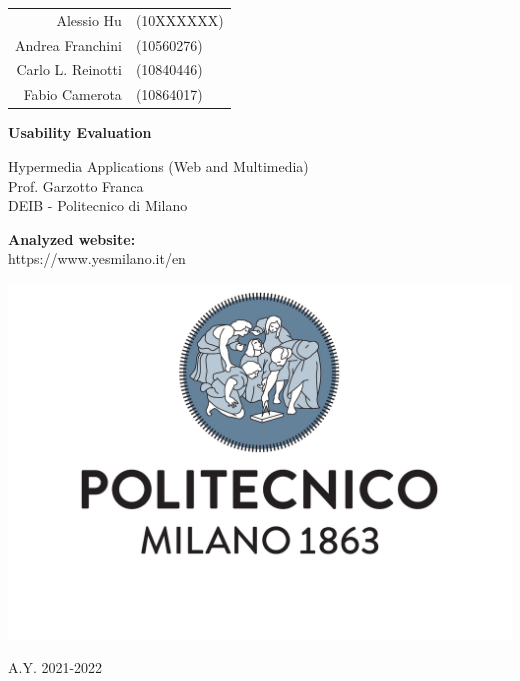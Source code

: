 \documentclass[a4paper]{article}
\begin{document}
\begin{titlepage}
	\centering
    \begin{tabular}{rl}
        Alessio Hu & (10XXXXXX) \\
        Andrea Franchini & (10560276) \\ 
        Carlo L. Reinotti & (10840446) \\
        Fabio Camerota & (10864017) \\
    \end{tabular}

    \vspace{1.5cm}
    {\Huge \textbf{Usability Evaluation\\}}
    \vspace{1.5cm}
    {\large 
        Hypermedia Applications (Web and Multimedia) \\
        Prof. Garzotto Franca \\ 
		DEIB - Politecnico di Milano \par
    }
    \vspace{1.5cm}
    {\large \textbf{Analyzed website:}\\
    \vspace{0.5cm}
    https://www.yesmilano.it/en}
    \par
    \vspace{3cm}
    \includegraphics[scale=0.4]{images/logo.pdf}
    \par
    \vspace{3cm}
	A.Y. 2021-2022
    
	
\end{titlepage}

\tableofcontents
    
    
    
    
    \pagebreak
    
    \pagebreak
    
\end{document}
